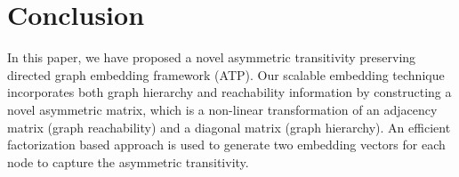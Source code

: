 \documentclass[letterpaper]{article} \usepackage{aaai19}  \usepackage{times}  \usepackage{helvet}  \usepackage{courier}  \usepackage{url}  \usepackage{graphicx}  \usepackage{booktabs} \usepackage{xcolor}
\begin{document}
\begin{comment}
\begin{figure*}
        \centering
        \begin{subfigure}[b]{0.48\textwidth}
            \centering
            \texttt{[image: pics/ATP\_ColdQuestion\_Routing\_MRR\_EGA]}
            \caption[MRR]{{\small MRR}}    
            \label{fig:mean and std of net14}
        \end{subfigure}
        \hfill
        \begin{subfigure}[b]{0.48\textwidth}  
            \centering 
            \texttt{[image: pics/ATP\_ColdQuestion\_Routing\_Accuracy\_EGA]}
            \caption[]{{\small Accuracy}}    
            \label{fig:mean and std of net24}
        \end{subfigure}
        \vskip\baselineskip
        \begin{subfigure}[b]{0.48\textwidth}   
            \centering 
            \texttt{[image: pics/ATP\_ColdQuestion\_Routing\_P1\_EGA]}
            \caption[]{{\small Precision$@$1}}    
            \label{fig:mean and std of net34}
        \end{subfigure}
        \quad
        \begin{subfigure}[b]{0.48\textwidth}   
            \centering 
            \texttt{[image: pics/ATP\_ColdQuestion\_Routing\_P3\_EGA]}
            \caption[]{{\small Precision$@$3}}    
            \label{fig:mean and std of net44}
        \end{subfigure}
        \caption[]
        {\small Cold Question Routing Performance of ATP on Competition Graphs w/wo EGA} 
        \label{fig:ATP_EGA_ColdStart_ExistingAsker}
\end{figure*}
\end{comment}



\section{Conclusion}
\label{sec:conclusion}

In this paper, we have proposed a novel asymmetric transitivity preserving directed graph embedding framework (ATP).
Our scalable embedding technique incorporates both graph hierarchy and reachability information by constructing a novel asymmetric matrix, which is a non-linear transformation of an adjacency matrix (graph reachability) and a diagonal matrix (graph hierarchy).
An efficient factorization based approach is used to generate two embedding vectors for each node to capture the asymmetric transitivity.
\end{document}
